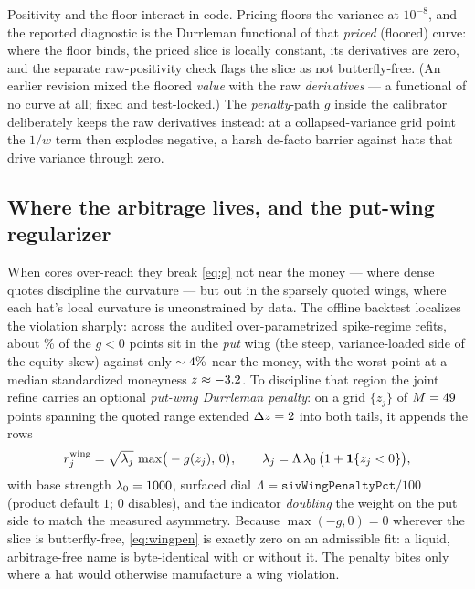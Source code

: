 \documentclass[11pt]{article}
\begin{document}
\begin{remark}
Positivity and the floor interact in code.  Pricing floors the variance at
$10^{-8}$, and the reported diagnostic is the Durrleman functional of that
\emph{priced} (floored) curve: where the floor binds, the priced slice is
locally constant, its derivatives are zero, and the separate raw-positivity
check flags the slice as not butterfly-free.  (An earlier revision mixed the
floored \emph{value} with the raw \emph{derivatives} --- a functional of no
curve at all; fixed and test-locked.)  The \emph{penalty}-path $g$ inside the
calibrator deliberately keeps the raw derivatives instead: at a collapsed-variance
grid point the $1/w$ term then explodes negative, a harsh de-facto barrier
against hats that drive variance through zero.
\end{remark}

\subsection{Where the arbitrage lives, and the put-wing regularizer}
\label{sec:wingpen}

When cores over-reach they break \eqref{eq:g} not near the money --- where dense
quotes discipline the curvature --- but out in the sparsely quoted wings, where
each hat's local curvature is unconstrained by data.  The offline backtest
localizes the violation sharply: across the audited over-parametrized
spike-regime refits, about \mcscorrputpct\% of the $g<0$ points sit in the
\emph{put} wing (the steep, variance-loaded side of the equity skew) against
only $\sim4\%$ near the money, with the worst point at a median
standardized moneyness $z\approx-3.2$.  To discipline that region the
joint refine carries an optional \emph{put-wing Durrleman penalty}: on a grid
$\{z_j\}$ of $M=49$ points spanning the quoted range extended
$\Delta z=2$ into both tails, it appends the rows
\begin{equation}
r^{\mathrm{wing}}_j=\sqrt{\lambda_j}\,\max\!\big(-g(z_j),\,0\big),
\qquad \lambda_j=\Lambda\,\lambda_0\,\big(1+\mathbf{1}\{z_j<0\}\big),
\label{eq:wingpen}
\end{equation}
with base strength $\lambda_0=1000$, surfaced dial
$\Lambda=\texttt{sivWingPenaltyPct}/100$ (product default $1$; $0$ disables),
and the indicator \emph{doubling} the weight on the put side to match the
measured asymmetry.  Because $\max(-g,0)=0$ wherever the slice is
butterfly-free, \eqref{eq:wingpen} is exactly zero on an admissible fit: a
liquid, arbitrage-free name is byte-identical with or without it.  The penalty
bites only where a hat would otherwise manufacture a wing violation.
\end{document}
